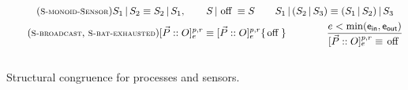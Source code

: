 \begin{myfigure}
  \begin{gather*}
     \tag{\SmonoidSensor}
    S_1 \parn S_2 \congr S_2 \parn S_1,
    \qquad
    S \parn \inactionn \congr S
    \qquad
    S_1 \parn (S_2 \parn S_3)  \congr (S_1 \parn S_2) \parn S_3
    \\
    \tag{\Sbroadcast, \Sbattery}
    \sensord \congr \tagsensor{\vec P}{O}{p}{r}{e}{\inactionn}
    \qquad \qquad
    \frac{
      e < \min(\energyIn, \energyOut)
    }{
      \sensor {\vec P}{O}{p}{r}{e} \congr \inactionn
    }
  \end{gather*}
  \\[-0.4cm]
\caption{Structural congruence for processes and sensors.}
\label{fig:structural-congruence}
\end{myfigure}

